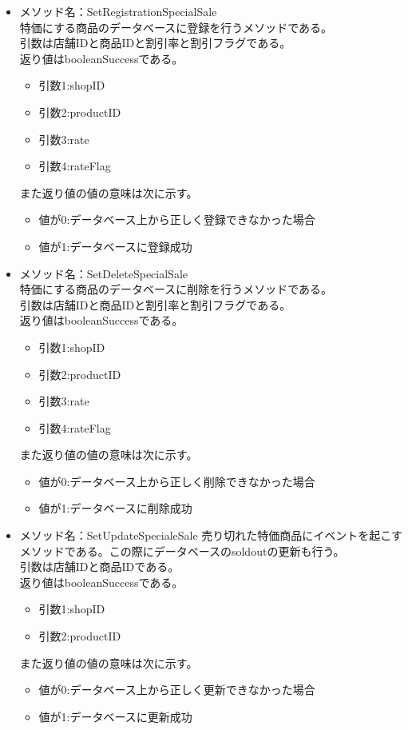 \documentclass[a4j]{jarticle}
\begin{document}
\begin{itemize}
\item メソッド名：SetRegistrationSpecialSale\\
特価にする商品のデータベースに登録を行うメソッドである。\\
引数は店舗IDと商品IDと割引率と割引フラグである。\\
返り値はbooleanSuccessである。
	\begin{itemize}
		\item 引数1:shopID
		\item 引数2:productID
		\item 引数3:rate
		\item 引数4:rateFlag
	\end{itemize}
また返り値の値の意味は次に示す。
	\begin{itemize}
		\item 値が0:データベース上から正しく登録できなかった場合
		\item 値が1:データベースに登録成功
	\end{itemize}
%
\item メソッド名：SetDeleteSpecialSale\\
特価にする商品のデータベースに削除を行うメソッドである。\\
引数は店舗IDと商品IDと割引率と割引フラグである。\\
返り値はbooleanSuccessである。
	\begin{itemize}
		\item 引数1:shopID
		\item 引数2:productID
		\item 引数3:rate
		\item 引数4:rateFlag
	\end{itemize}
また返り値の値の意味は次に示す。
	\begin{itemize}
		\item 値が0:データベース上から正しく削除できなかった場合
		\item 値が1:データベースに削除成功
	\end{itemize}
%
\item メソッド名：SetUpdateSpecialeSale
売り切れた特価商品にイベントを起こすメソッドである。この際にデータベースのsoldoutの更新も行う。\\
引数は店舗IDと商品IDである。\\
返り値はbooleanSuccessである。
	\begin{itemize}
		\item 引数1:shopID
		\item 引数2:productID

	\end{itemize}
また返り値の値の意味は次に示す。
	\begin{itemize}
		\item 値が0:データベース上から正しく更新できなかった場合
		\item 値が1:データベースに更新成功
	\end{itemize}
\end{itemize}
\end{document}

